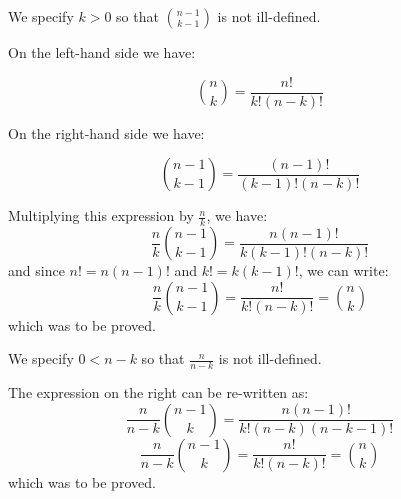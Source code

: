 \documentclass[a4paper,12pt]{article}
\begin{document}

We specify $k > 0$ so that $\binom{n-1}{k-1}$ is not ill-defined.

On the left-hand side we have:

\[ \binom{n}{k} = \frac{n!}{k! (n-k)!} \]

On the right-hand side we have:

\[ \binom{n-1}{k-1} = \frac{(n-1)!}{(k-1)!(n-k)!} \]

Multiplying this expression by $\frac{n}{k}$, we have:
\[ \frac{n}{k} \binom{n-1}{k-1} = \frac{n(n-1)!}{k(k-1)!(n-k)!}\]
and since $n! = n(n-1)!$ and $k! = k(k-1)!$, we can write:
\[ \frac{n}{k} \binom{n-1}{k-1} = \frac{n!}{k!(n-k)!} = \binom{n}{k} \]
which was to be proved. 

\vspace{5mm}

We specify $0 < n-k$ so that $\frac{n}{n-k}$ is not ill-defined.

The expression on the right can be re-written as:
\[ \frac{n}{n-k} \binom{n-1}{k} =  \frac{n(n-1)!}{k!(n-k)(n-k-1)!} \]
\[ \frac{n}{n-k} \binom{n-1}{k} = \frac{n!}{k!(n-k)!} = \binom{n}{k} \]
which was to be proved. 

\vspace{5mm}
\end{document}
